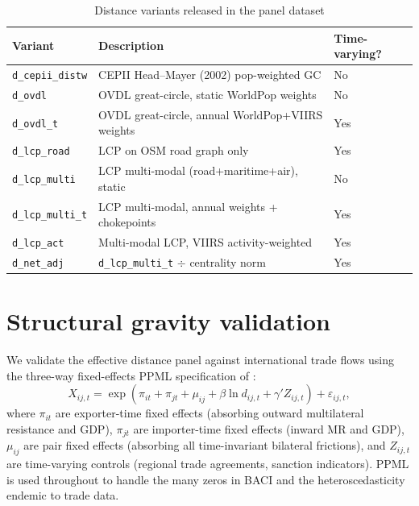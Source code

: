 \documentclass[11pt, a4paper]{article}
\begin{document}
\begin{table}[h]
\caption{Distance variants released in the panel dataset}
\label{tab:variants}
\centering\small
\begin{tabular}{lll}
\hline
Variant & Description & Time-varying? \\
\hline
\texttt{d\_cepii\_distw}  & CEPII Head--Mayer (2002) pop-weighted GC & No \\
\texttt{d\_ovdl}          & OVDL great-circle, static WorldPop weights & No \\
\texttt{d\_ovdl\_t}       & OVDL great-circle, annual WorldPop+VIIRS weights & Yes \\
\texttt{d\_lcp\_road}     & LCP on OSM road graph only & Yes \\
\texttt{d\_lcp\_multi}    & LCP multi-modal (road+maritime+air), static & No \\
\texttt{d\_lcp\_multi\_t} & LCP multi-modal, annual weights + chokepoints & Yes \\
\texttt{d\_lcp\_act}      & Multi-modal LCP, VIIRS activity-weighted & Yes \\
\texttt{d\_net\_adj}      & \texttt{d\_lcp\_multi\_t} $\div$ centrality norm & Yes \\
\hline
\end{tabular}
\end{table}

\section{Structural gravity validation}
\label{sec:gravity}

We validate the effective distance panel against international trade flows using
the three-way fixed-effects PPML specification of \citet{yotov_piermartini_monteiro_larch_2016}:
\begin{equation}
X_{ij,t} = \exp\left( \pi_{it} + \pi_{jt} + \mu_{ij} + \beta \ln d_{ij,t}
  + \gamma' Z_{ij,t} \right) + \varepsilon_{ij,t},
\label{eq:gravity}
\end{equation}
where $\pi_{it}$ are exporter-time fixed effects (absorbing outward multilateral
resistance and GDP), $\pi_{jt}$ are importer-time fixed effects (inward MR and
GDP), $\mu_{ij}$ are pair fixed effects (absorbing all time-invariant bilateral
frictions), and $Z_{ij,t}$ are time-varying controls (regional trade agreements,
sanction indicators).  PPML \citep{santos_silva_tenreyro_2006} is used
throughout to handle the many zeros in BACI and the heteroscedasticity endemic
to trade data.
\end{document}
